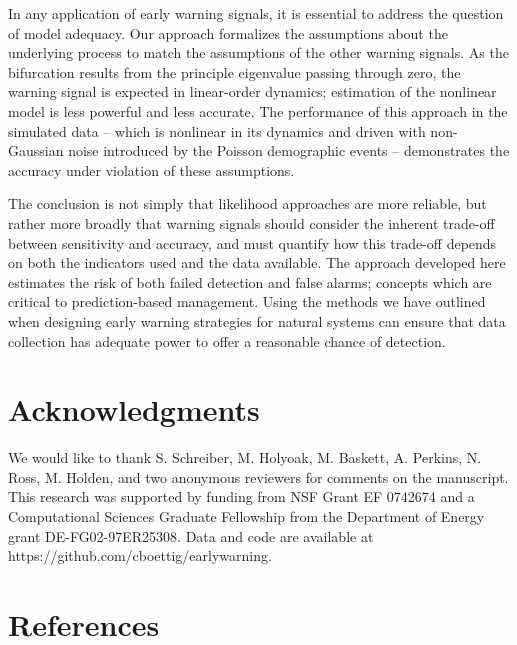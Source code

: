 \documentclass[authoryear,review,11pt]{elsarticle}
\begin{document}
In any application of early warning signals, it is essential to address the question of model adequacy.
Our approach formalizes the assumptions about the underlying process to match the assumptions of the other warning signals.
As the bifurcation results from the principle eigenvalue passing through zero,
the warning signal is expected in linear-order dynamics;
estimation of the nonlinear model is less powerful and less accurate.
The performance of this approach in the simulated data -- which is nonlinear in its dynamics
and driven with non-Gaussian noise introduced by the Poisson demographic events --
demonstrates the accuracy under violation of these assumptions.

The conclusion is not simply that likelihood approaches are more reliable,
but rather more broadly that warning signals should consider
the inherent trade-off between sensitivity and accuracy,
and must quantify how this trade-off depends on both the indicators used and the data available.
The approach developed here estimates the risk of both failed detection and false alarms;
concepts which are critical to prediction-based management.
Using the methods we have outlined when designing early warning strategies for natural systems
can ensure that data collection has adequate power to offer a reasonable chance of detection.


\section{Acknowledgments}
We would like to thank S. Schreiber, M. Holyoak, M. Baskett, A. Perkins, N. 
Ross, M. Holden, and two anonymous reviewers for comments on the manuscript. 
This research was supported by funding from NSF Grant EF 0742674 
and a Computational Sciences Graduate Fellowship from the Department of Energy grant DE-FG02-97ER25308. 
Data and code are available at https://github.com/cboettig/earlywarning.




\section{References}%

%
 
\end{document}

